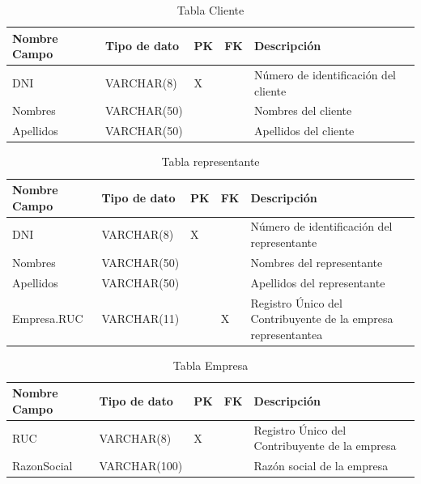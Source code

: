 \documentclass[12pt]{article}
\begin{document}
\begin{table}[htbp]
    \begin{center}
        \begin{tabular}{|p{3cm}|p{3cm}|p{1cm}|p{1cm}|p{6cm}|}
            \hline
            Nombre Campo & Tipo de dato & PK & FK & Descripción \\
            \hline
            DNI & VARCHAR(8) & X &  & Número de identificación del cliente \\
            Nombres & VARCHAR(50) &  &  & Nombres del cliente \\
            Apellidos & VARCHAR(50) &  &  & Apellidos del cliente \\
            \hline
            \end{tabular}
        \caption{Tabla Cliente}
            \end{center}
\end{table}


\begin{table}[htbp]
    \begin{center}
        \begin{tabular}{|p{3cm}|p{3cm}|p{1cm}|p{1cm}|p{6cm}|}
            \hline
            Nombre Campo & Tipo de dato & PK & FK & Descripción \\
            \hline
            DNI & VARCHAR(8) & X &  & Número de identificación del representante \\
            Nombres & VARCHAR(50) &  &  & Nombres del representante \\
            Apellidos & VARCHAR(50) &  &  & Apellidos del representante \\
            Empresa.RUC & VARCHAR(11) &  & X & Registro Único del Contribuyente de la empresa representantea \\
            \hline
            \end{tabular}
        \caption{Tabla representante}
            \end{center}
\end{table}


\begin{table}[htbp]
    \begin{center}
        \begin{tabular}{|p{3cm}|p{3cm}|p{1cm}|p{1cm}|p{6cm}|}
            \hline
            Nombre Campo & Tipo de dato & PK & FK & Descripción \\
            \hline
            RUC & VARCHAR(8) & X &  & Registro Único del Contribuyente de la empresa \\
            RazonSocial & VARCHAR(100) &  &  & Razón social de la empresa \\
            \hline
            \end{tabular}
        \caption{Tabla Empresa}
            \end{center}
\end{table}
\end{document}
